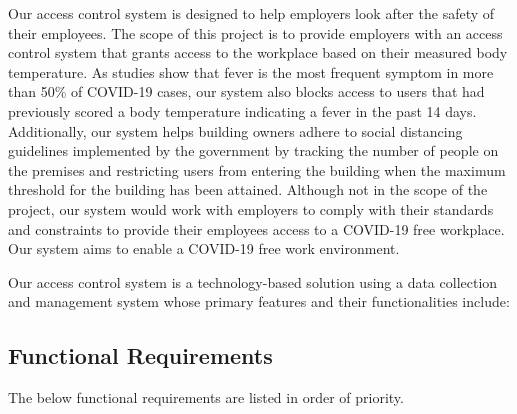 Our access control system is designed to help employers look after the safety
of their employees. The scope of this project is to provide employers with an
access control system that grants access to the workplace based on their
measured body temperature. As studies show that fever is the most frequent
symptom in more than 50\% of COVID-19 cases, our system also blocks access to
users that had previously scored a body temperature indicating a fever in the
past 14 days. Additionally, our system helps building owners adhere to social
distancing guidelines implemented by the government by tracking the number of
people on the premises and restricting users from entering the building when
the maximum threshold for the building has been attained. Although not in the
scope of the project, our system would work with employers to comply with their
standards and constraints to provide their employees access to a COVID-19 free
workplace. Our system aims to enable a COVID-19 free work environment.

Our access control system is a technology-based solution using a data collection
and management system whose primary features and their functionalities include:

\subsection{Functional Requirements}

The below functional requirements are listed in order of priority.

